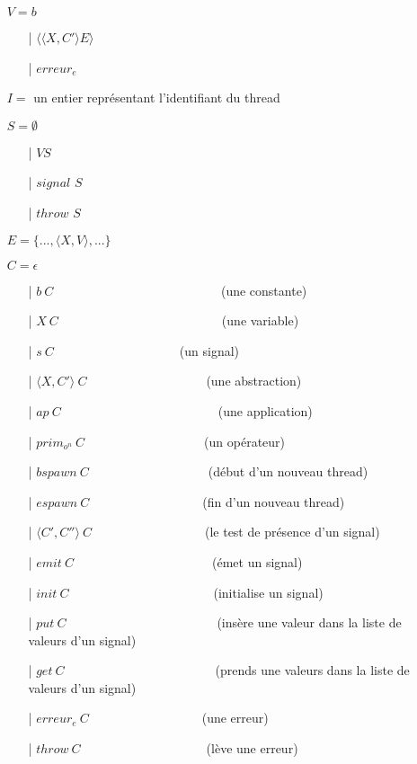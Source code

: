 \documentclass[10pt,a4paper]{report}
\begin{document}
\begin{itemize}
\item[] $V = b$	
  \begin{itemize}
  \item[|] $\langle\langle X,C' \rangle E\rangle$
  \item[|] $erreur_{e}$
  \end{itemize}
\item[] $I =$ un entier représentant l'identifiant du thread
\item[] $S =  \emptyset$ 
  \begin{itemize}
  \item[|] $V S$
  \item[|] $signal$ $S$
  \item[|] $throw$ $S$
  \end{itemize}
\item[] $E = \{...,\langle X,V\rangle,...\}$
\item[] $C = \epsilon$
  \begin{itemize}
  \item[|] $b~C$~~~~~~~~~~~~~~~~~~~~~~~~~~    (une constante)
  \item[|] $X~C$~~~~~~~~~~~~~~~~~~~~~~~~~~(une variable)
  \item[|] $s~C$~~~~~~~~~~~~~~~~~~~~(un signal)
  \item[|] $\langle X,C'\rangle~C$~~~~~~~~~~~~~~~~~~~(une abstraction)
  \item[|] $ap~C$~~~~~~~~~~~~~~~~~~~~~~~~~(une application)
  \item[|] $prim_{o^{n}}~C$~~~~~~~~~~~~~~~~~~~(un opérateur)
  \item[|] $bspawn~C$~~~~~~~~~~~~~~~~~~~(début d'un nouveau thread)
  \item[|] $espawn~C$~~~~~~~~~~~~~~~~~~(fin d'un nouveau thread)
  \item[|] $\langle C',C''\rangle~C$~~~~~~~~~~~~~~~~~~(le test de présence d'un signal)
  \item[|] $emit~C$~~~~~~~~~~~~~~~~~~~~~~(émet un signal)
  \item[|] $init~C$~~~~~~~~~~~~~~~~~~~~~~~(initialise un signal)
  \item[|] $put~C$~~~~~~~~~~~~~~~~~~~~~~~~(insère une valeur dans la liste de valeurs d'un signal)
  \item[|] $get~C$~~~~~~~~~~~~~~~~~~~~~~~~(prends une valeurs dans la liste de valeurs d'un signal)
  \item[|] $erreur_{e}~C$~~~~~~~~~~~~~~~~~~(une erreur)
  \item[|] $throw~C$~~~~~~~~~~~~~~~~~~~~(lève une erreur)

\end{itemize}
\end{itemize}
\end{document}

